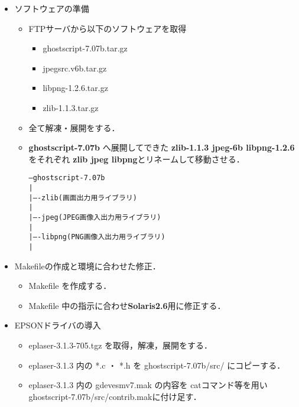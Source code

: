 \documentclass[a4j]{jarticle}
\begin{document}
\begin{itemize}
\item ソフトウェアの準備
\begin{itemize}
\item FTPサーバから以下のソフトウェアを取得
\begin{itemize}
\item ghostscript-7.07b.tar.gz
\item jpegsrc.v6b.tar.gz
\item libpng-1.2.6.tar.gz
\item zlib-1.1.3.tar.gz
\end{itemize}
\item 全て解凍・展開をする．
\item {\bf ghostscript-7.07b} へ展開してできた {\bf zlib-1.1.3 jpeg-6b libpng-1.2.6}をそれぞれ {\bf zlib jpeg libpng}とリネームして移動させる．\\
\begin{center}
\begin{breakbox}
\begin{alltt}
---ghostscript-7.07b
          |
          |----zlib (画面出力用ライブラリ)
          |
          |----jpeg (JPEG画像入出力用ライブラリ)
          |
          |----libpng (PNG画像入出力用ライブラリ)
          |
\end{alltt}
\end{breakbox}
\end{center}
\end{itemize}
\item Makefileの作成と環境に合わせた修正．
\begin{itemize}
\item Makefile を作成する．
\item Makefile 中の指示に合わせ{\bf Solaris2.6}用に修正する．
\end{itemize}
\item EPSONドライバの導入
\begin{itemize}
\item eplaser-3.1.3-705.tgz を取得，解凍，展開をする．
\item eplaser-3.1.3 内の *.c ・ *.h を ghostscript-7.07b/src/ にコピーする．
\item eplaser-3.1.3 内の gdevesmv7.mak の内容を catコマンド等を用いghostscript-7.07b/src/contrib.makに付け足す．


\end{itemize}
\end{itemize}
\end{document}

